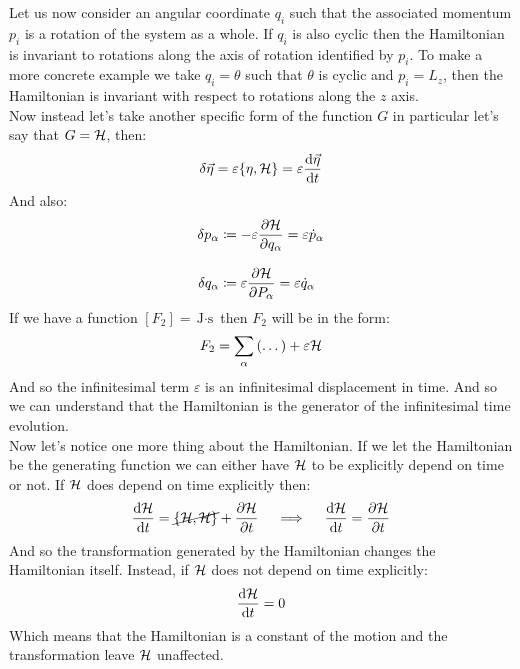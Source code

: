 Let us now consider an angular coordinate $q_i$ such that the associated momentum $p_i$ is a rotation of the system as a whole. If $q_i$ is also cyclic then the Hamiltonian is invariant to rotations along the axis of rotation identified by $p_i$. To make a more concrete example we take $q_i = \theta$ such that $\theta$ is cyclic and $p_i = L_z$, then the Hamiltonian is invariant with respect to rotations along the $z$ axis.\\
Now instead let's take another specific form of the function $G$ in particular let's say that $G= \mathcal{H}$, then:
\begin{equation}
  \delta \vec{\eta} = \varepsilon\pb{\eta}{\hamfun} = \varepsilon\dv{\vec{\eta}}{t}
\end{equation}
And also:
\begin{equation}
  \begin{split}
      \delta p_{\alpha} &\defineeq -\varepsilon\pdv{\hamfun}{q_{\alpha}} = \varepsilon \dot{p}_{\alpha}\\[8pt]
      \delta q_{\alpha} &\defineeq \varepsilon\pdv{\hamfun}{P_{\alpha}} = \varepsilon \dot{q}_{\alpha}
  \end{split}
\end{equation}
If we have a function $[F_2] = \unit{\joule  \cdot \second}$ then $F_2$ will be in the form:
\begin{equation}
  F_2 = \displaystyle\sum_{\alpha}\left(\dots\right) + \varepsilon \mathcal{H}
\end{equation}
And so the infinitesimal term $\varepsilon$ is an infinitesimal displacement in time. And so we can understand that the Hamiltonian is the generator of the infinitesimal time evolution.\\
Now let's notice one more thing about the Hamiltonian. If we let the Hamiltonian be the generating function we can either have $\mathcal{H}$ to be explicitly depend on time or not. If $\mathcal{H}$ does depend on time explicitly then:
\begin{equation}
  \dv{\hamfun}{t} = \cancel{\pb{\hamfun}{\hamfun}} + \pdv{\hamfun}{t} \quad \implies \quad  \dv{\hamfun}{t} = \pdv{\hamfun}{t}
\end{equation}
And so the transformation generated by the Hamiltonian changes the Hamiltonian itself. Instead, if $\mathcal{H}$ does not depend on time explicitly:
\begin{equation}
  \dv{\hamfun}{t} = 0
\end{equation}
Which means that the Hamiltonian is a constant of the motion and the transformation leave $\mathcal{H}$ unaffected.\\
